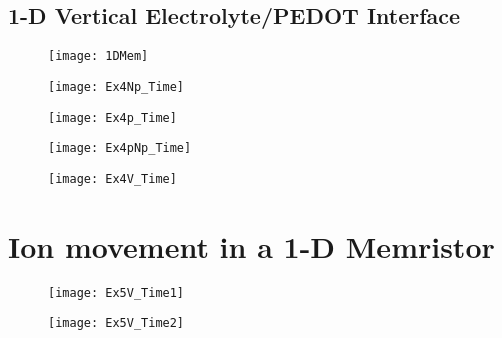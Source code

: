 \clearpage
\subsection{1-D Vertical Electrolyte/PEDOT Interface}


\begin{figure}[!htp]
\centering
\texttt{[image: 1DMem]}
\caption{} 
\label{}
\end{figure}

\begin{landscape}
\begin{figure}[!htp]
\centering
\texttt{[image: Ex4Np\_Time]}
\caption{} 
\label{}
\end{figure}
\end{landscape}

\begin{landscape}
\begin{figure}[!htp]
\centering
\texttt{[image: Ex4p\_Time]}
\caption{} 
\label{}
\end{figure}
\end{landscape}

\begin{landscape}
\begin{figure}[!htp]
\centering
\texttt{[image: Ex4pNp\_Time]}
\caption{} 
\label{}
\end{figure}
\end{landscape}

\begin{landscape}
\begin{figure}[!htp]
\centering
\texttt{[image: Ex4V\_Time]}
\caption{} 
\label{}
\end{figure}
\end{landscape}

\section{Ion movement in a 1-D Memristor}


\begin{landscape}
\begin{figure}[!htp]
\centering
\texttt{[image: Ex5V\_Time1]}
\caption{} 
\label{}
\end{figure}
\end{landscape}

\begin{landscape}
\begin{figure}[!htp]
\centering
\texttt{[image: Ex5V\_Time2]}
\caption{} 
\label{}
\end{figure}
\end{landscape}

